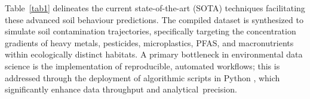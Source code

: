 \documentclass[environremediat,article,accept,pdftex,oneauthor]{Definitions/mdpi}
\begin{document}
Table~\ref{tab1} delineates the current state-of-the-art (SOTA) techniques
facilitating these advanced soil behaviour predictions. The compiled dataset is synthesized to simulate soil contamination
trajectories, specifically targeting the concentration gradients of heavy
metals, pesticides, microplastics, PFAS, and macronutrients within
ecologically distinct habitats. A primary bottleneck in environmental data
science is the implementation of reproducible, automated workflows; this is
addressed through the deployment of algorithmic scripts in Python
\cite{Olah2025,Lemenkova2022,Wang2024b}, which significantly enhance data
throughput and \mbox{analytical precision.}

\begin{table}[H]
\small
\caption{SOTA %
 techniques and instruments used for detecting pollutant
    concentrations and evaluating the level of soil
    contamination.\label{tab1}}


\end{table}
\end{document}
